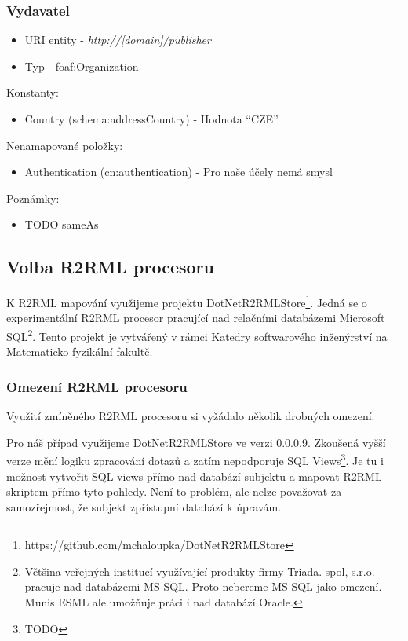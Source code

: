 \subsubsection*{Vydavatel}

\begin{itemize}
\item URI entity  - \textit{http://[domain]/publisher}
\item Typ - foaf:Organization
\end{itemize}

Konstanty:
\begin{itemize}
\item Country (schema:addressCountry) - Hodnota “CZE”
\end{itemize}

Nenamapované položky:
\begin{itemize}
\item Authentication (cn:authentication) - Pro naše účely nemá smysl
\end{itemize}

Poznámky:
\begin{itemize}
\item TODO sameAs
\end{itemize}

\subsection{Volba R2RML procesoru}

K R2RML mapování využijeme projektu DotNetR2RMLStore\footnote{https://github.com/mchaloupka/DotNetR2RMLStore}. Jedná se o experimentální R2RML procesor pracující nad relačními databázemi Microsoft SQL\footnote{Většina veřejných institucí využívající produkty firmy Triada. spol, s.r.o. pracuje nad databázemi MS SQL. Proto nebereme MS SQL jako omezení. Munis ESML ale umožňuje práci i nad databází Oracle.}. Tento projekt je vytvářený v rámci Katedry softwarového inženýrství na Matematicko-fyzikální fakultě. 

\subsubsection{Omezení R2RML procesoru}

Využití zmíněného R2RML procesoru si vyžádalo několik drobných omezení. 

Pro náš případ využijeme DotNetR2RMLStore ve verzi 0.0.0.9. Zkoušená vyšší verze mění logiku zpracování dotazů a zatím nepodporuje SQL Views\footnote{TODO}. Je tu i možnost vytvořit SQL views přímo nad databází subjektu a mapovat R2RML skriptem přímo tyto pohledy. Není to problém, ale nelze považovat za samozřejmost, že subjekt zpřístupní databází k úpravám. 

